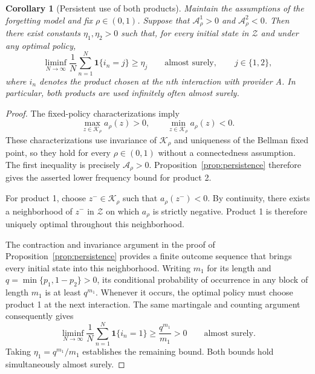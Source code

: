 \documentclass[11pt]{article}
\newtheorem{corollary}{Corollary}
\begin{document}
\begin{corollary}[Persistent use of both products]
\label{cor:both-products-persist}
Maintain the assumptions of the forgetting model and fix
$\rho\in(0,1)$.
Suppose that
$\mathcal A_\rho^1>0$ and $\mathcal A_\rho^2<0$.
Then there exist constants $\eta_1,\eta_2>0$ such that,
for every initial state in $\mathcal Z$ and under any optimal
policy,
\begin{equation}
\liminf_{N\to\infty}
\frac{1}{N}\sum_{n=1}^{N}\mathbf 1\{i_n=j\}
\ge \eta_j
\qquad\text{almost surely},\qquad j\in\{1,2\},
\end{equation}
where $i_n$ denotes the product chosen at the $n$th interaction
with provider A.
In particular, both products are used infinitely often
almost surely.
\end{corollary}

\begin{proof}
The fixed-policy characterizations imply
\begin{equation*}
\max_{z\in\mathcal K_\rho}a_\rho(z)>0,
\qquad
\min_{z\in\mathcal K_\rho}a_\rho(z)<0.
\end{equation*}
These characterizations use invariance of $\mathcal K_\rho$
and uniqueness of the Bellman fixed point, so they hold for
every $\rho\in(0,1)$ without a connectedness assumption.
The first inequality is precisely $\mathcal A_\rho>0$.
Proposition~\ref{prop:persistence} therefore gives the asserted
lower frequency bound for product 2.

For product 1, choose $z^-\in\mathcal K_\rho$ such that
$a_\rho(z^-)<0$.
By continuity, there exists a neighborhood of $z^-$ in
$\mathcal Z$ on which $a_\rho$ is strictly negative.
Product 1 is therefore uniquely optimal throughout this
neighborhood.

The contraction and invariance argument in the proof of
Proposition~\ref{prop:persistence} provides a finite outcome
sequence that brings every initial state into this neighborhood.
Writing $m_1$ for its length and
$q=\min\{p_1,1-p_2\}>0$, its conditional probability of occurrence
in any block of length $m_1$ is at least $q^{m_1}$.
Whenever it occurs, the optimal policy must choose product 1
at the next interaction.
The same martingale and counting argument consequently gives
\begin{equation*}
\liminf_{N\to\infty}
\frac{1}{N}\sum_{n=1}^{N}\mathbf 1\{i_n=1\}
\ge \frac{q^{m_1}}{m_1}>0
\qquad\text{almost surely}.
\end{equation*}
Taking $\eta_1=q^{m_1}/m_1$ establishes the remaining bound.
Both bounds hold simultaneously almost surely.
\end{proof}
\end{document}
